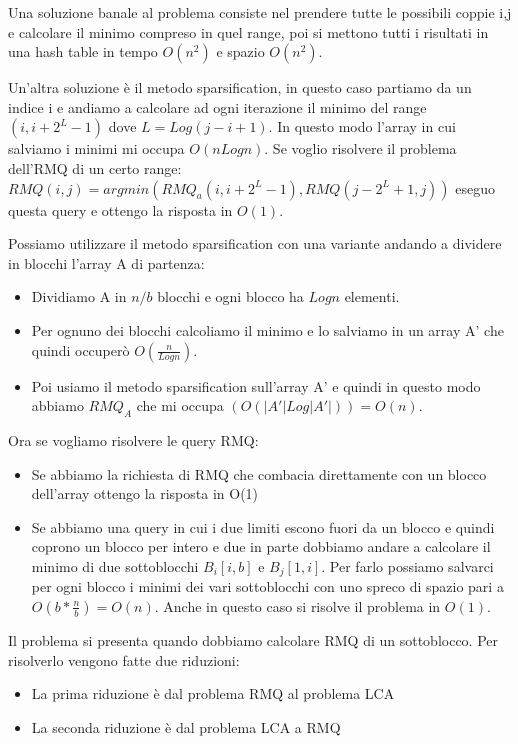 \documentclass[12pt]{article}
\begin{document}
Una soluzione banale al problema consiste nel prendere tutte le possibili coppie i,j e calcolare il minimo compreso in quel range, poi si mettono tutti i risultati in una hash table in tempo $O(n^2)$ e spazio $O(n^2)$.

Un'altra soluzione è il metodo sparsification, in questo caso partiamo da un indice i e andiamo a calcolare ad ogni iterazione il minimo del range $(i,i+2^L-1)$ dove $L=Log(j-i+1)$. In questo modo l'array in cui salviamo i minimi mi occupa $O(nLogn)$.
Se voglio risolvere il problema dell'RMQ di un certo range:
$RMQ(i,j)=argmin(RMQ_a(i,i+2^L-1),RMQ(j-2^L+1,j))$ eseguo questa query e ottengo la risposta in $O(1)$.

Possiamo utilizzare il metodo sparsification con una variante andando a dividere in blocchi l'array A di partenza:
\begin{itemize}
\item Dividiamo A in $n/b$ blocchi e ogni blocco ha $Logn$ elementi.
\item Per ognuno dei blocchi calcoliamo il minimo e lo salviamo in un array A' che quindi occuperò $O(\frac{n}{Logn})$.
\item Poi usiamo il metodo sparsification sull'array A' e quindi in questo modo abbiamo $RMQ_A$ che mi occupa $(O(|A'|Log|A'|)) = O(n)$.
\end{itemize}

Ora se vogliamo risolvere le query RMQ:
\begin{itemize}
\item Se abbiamo la richiesta di RMQ che combacia direttamente con un blocco dell'array ottengo la risposta in O(1)
\item Se abbiamo una query in cui i due limiti escono fuori da un blocco e quindi coprono un blocco per intero e due in parte dobbiamo andare a calcolare il minimo di due sottoblocchi $B_i[i,b]$ e $B_j[1,i]$. Per farlo possiamo salvarci per ogni blocco i minimi dei vari sottoblocchi con uno spreco di spazio pari a $O(b*\frac{n}{b})=O(n)$.
Anche in questo caso si risolve il problema in $O(1)$.
\end{itemize}

Il problema si presenta quando dobbiamo calcolare RMQ di un sottoblocco. 
Per risolverlo vengono fatte due riduzioni:
\begin{itemize}
\item La prima riduzione è dal problema RMQ al problema LCA
\item La seconda riduzione è dal problema LCA a RMQ
\end{itemize}
\end{document}
